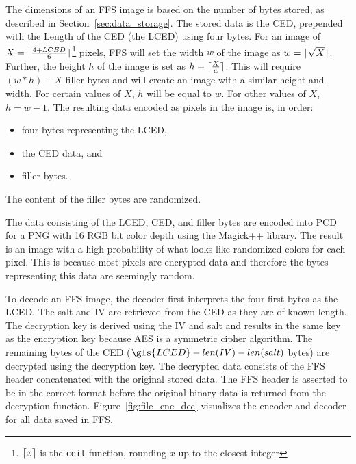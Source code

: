 The dimensions of an \gls{FFS} image is based on the number of bytes stored, as described in Section~\ref{sec:data_storage}. The stored data is the CED, prepended with the Length of the \gls{CED} (the \gls{LCED}) using four bytes. For an image of $X = \lceil \frac{4 + LCED}{6} \rceil$\footnote{$\lceil x \rceil$ is the \texttt{ceil} function, rounding $x$ up to the closest integer} pixels, \gls{FFS} will set the width $w$ of the image as $w = \lceil \sqrt{X} \rceil$. Further, the height $h$ of the image is set as $h = \lceil \frac{X}{w} \rceil$. This will require $(w * h) - X$ filler bytes and will create an image with a similar height and width. For certain values of $X$, $h$ will be equal to $w$. For other values of $X$, $h = w-1$. The resulting data encoded as pixels in the image is, in order:
\begin{itemize}
	\item four bytes representing the \gls{LCED},
	\item the \gls{CED} data, and
	\item filler bytes.
\end{itemize}
The content of the filler bytes are randomized.

The data consisting of the \gls{LCED}, CED, and filler bytes are encoded into \gls{PCD} for a PNG with 16 \gls{RGB} bit color depth using the Magick++ library. The result is an image with a high probability of what looks like randomized colors for each pixel. This is because most pixels are encrypted data and therefore the bytes representing this data are seemingly random.

To decode an \gls{FFS} image, the decoder first interprets the four first bytes as the \gls{LCED}. The salt and \gls{IV} are retrieved from the \gls{CED} as they are of known length. The decryption key is derived using the \gls{IV} and salt and results in the same key as the encryption key because \gls{AES} is a symmetric cipher algorithm. The remaining bytes of the \gls{CED} ($\gls{LCED} - len(IV) - len(salt)$ bytes) are decrypted using the decryption key. The decrypted data consists of the \gls{FFS} header concatenated with the original stored data. The \gls{FFS} header is asserted to be in the correct format before the original binary data is returned from the decryption function. Figure~\ref{fig:file_enc_dec} visualizes the encoder and decoder for all data saved in \gls{FFS}.

